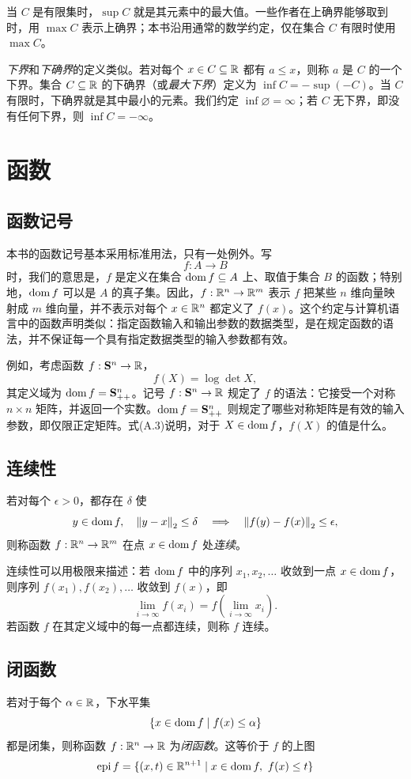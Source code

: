 当 $C$ 是有限集时，$\sup C$ 就是其元素中的最大值。一些作者在上确界能够取到时，用 $\max C$ 表示上确界；本书沿用通常的数学约定，仅在集合 $C$ 有限时使用 $\max C$。

\emph{下界}和\emph{下确界}的定义类似。若对每个 $x\in C\subseteq\mathbb R$ 都有 $a\leq x$，则称 $a$ 是 $C$ 的一个下界。集合 $C\subseteq\mathbb R$ 的下确界（或\emph{最大下界}）定义为 $\inf C=-\sup(-C)$。当 $C$ 有限时，下确界就是其中最小的元素。我们约定 $\inf\varnothing=\infty$；若 $C$ 无下界，即没有任何下界，则 $\inf C=-\infty$。

\section{函数}
\subsection{函数记号}
本书的函数记号基本采用标准用法，只有一处例外。写
\[
 f:A\to B
\]
时，我们的意思是，$f$ 是定义在集合 $\operatorname{dom} f\subseteq A$ 上、取值于集合 $B$ 的函数；特别地，$\operatorname{dom} f$ 可以是 $A$ 的真子集。因此，$f:\mathbb R^n\to\mathbb R^m$ 表示 $f$ 把某些 $n$ 维向量映射成 $m$ 维向量，并不表示对每个 $x\in\mathbb R^n$ 都定义了 $f(x)$。这个约定与计算机语言中的函数声明类似：指定函数输入和输出参数的数据类型，是在规定函数的语法，并不保证每一个具有指定数据类型的输入参数都有效。

例如，考虑函数 $f:\mathbf S^n\to\mathbb R$，
\begin{equation}
 f(X)=\log\det X,\tag{A.3}
\end{equation}
其定义域为 $\operatorname{dom} f=\mathbf S_{++}^n$。记号 $f:\mathbf S^n\to\mathbb R$ 规定了 $f$ 的语法：它接受一个对称 $n\times n$ 矩阵，并返回一个实数。$\operatorname{dom} f=\mathbf S_{++}^n$ 则规定了哪些对称矩阵是有效的输入参数，即仅限正定矩阵。式(A.3)说明，对于 $X\in\operatorname{dom} f$，$f(X)$ 的值是什么。

\subsection{连续性}
若对每个 $\epsilon>0$，都存在 $\delta$ 使
\[
 y\in\operatorname{dom} f,\quad\left\lVert y-x\right\rVert_2\leq\delta
 \quad\Longrightarrow\quad\left\lVert f(y)-f(x)\right\rVert_2\leq\epsilon,
\]
则称函数 $f:\mathbb R^n\to\mathbb R^m$ 在点 $x\in\operatorname{dom} f$ 处\emph{连续}。

连续性可以用极限来描述：若 $\operatorname{dom} f$ 中的序列 $x_1,x_2,\ldots$ 收敛到一点 $x\in\operatorname{dom} f$，则序列 $f(x_1),f(x_2),\ldots$ 收敛到 $f(x)$，即
\[
 \lim_{i\to\infty}f(x_i)=f\left(\lim_{i\to\infty}x_i\right).
\]
若函数 $f$ 在其定义域中的每一点都连续，则称 $f$ 连续。

\subsection{闭函数}
若对于每个 $\alpha\in\mathbb R$，下水平集
\[
 \{x\in\operatorname{dom} f\mid f(x)\leq\alpha\}
\]
都是闭集，则称函数 $f:\mathbb R^n\to\mathbb R$ 为\emph{闭函数}。这等价于 $f$ 的上图
\[
 \operatorname{epi} f=\{(x,t)\in\mathbb R^{n+1}\mid x\in\operatorname{dom} f,\ f(x)\leq t\}
\]

